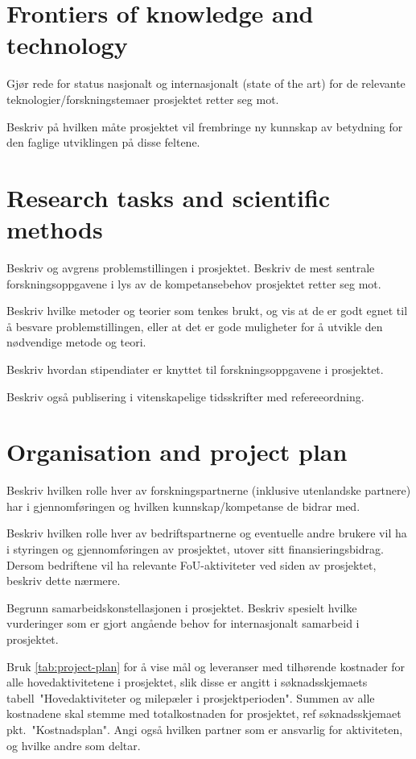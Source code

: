 \documentclass[11pt,a4paper,british]{article}
\begin{document}
\section{Frontiers of knowledge and technology}
Gjør rede for status nasjonalt og internasjonalt (state of the art) for de relevante teknologier/forskningstemaer prosjektet retter seg mot.

Beskriv på hvilken måte prosjektet vil frembringe ny kunnskap av betydning for den faglige utviklingen på disse feltene.

\section{Research tasks and scientific methods}
Beskriv og avgrens problemstillingen i prosjektet.
Beskriv de mest sentrale forskningsoppgavene i lys av de kompetansebehov prosjektet retter seg mot.

Beskriv hvilke metoder og teorier som tenkes brukt, og vis at de er godt egnet til å besvare problemstillingen, eller at det er gode muligheter for å utvikle den nødvendige metode og teori.

Beskriv hvordan stipendiater er knyttet til forskningsoppgavene i prosjektet.

Beskriv også publisering i vitenskapelige tidsskrifter med refereeordning.

\section{Organisation and project plan}
Beskriv hvilken rolle hver av forskningspartnerne (inklusive utenlandske partnere) har i gjennomføringen og hvilken kunnskap/kompetanse de bidrar med.

Beskriv hvilken rolle hver av bedriftspartnerne og eventuelle andre brukere vil ha i styringen og gjennomføringen av prosjektet, utover sitt finansieringsbidrag.
Dersom bedriftene vil ha relevante FoU-aktiviteter ved siden av prosjektet, beskriv dette nærmere.

Begrunn samarbeidskonstellasjonen i prosjektet.
Beskriv spesielt hvilke vurderinger som er gjort angående behov for internasjonalt samarbeid i prosjektet.

Bruk \cref{tab:project-plan} for å vise mål og leveranser med tilhørende kostnader for alle hovedaktivitetene i prosjektet, slik disse er angitt i søknadsskjemaets tabell~"Hovedaktiviteter og milepæler i prosjektperioden".
Summen av alle kostnadene skal stemme med totalkostnaden for prosjektet, ref søknadsskjemaet pkt.~"Kostnadsplan".
Angi også hvilken partner som er ansvarlig for aktiviteten, og hvilke andre som deltar.
\end{document}
